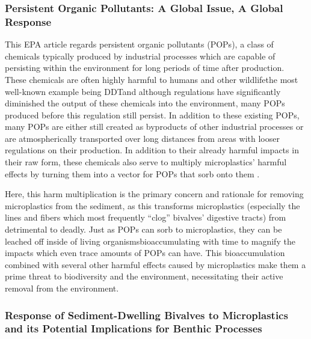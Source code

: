 \documentclass[fleqn,10pt]{SelfArx} %
\begin{document}
	
	\subsubsection*{Persistent Organic Pollutants: A Global Issue, A Global Response}
	This EPA article regards persistent organic pollutants (POPs), a class of chemicals typically produced by industrial processes which are capable of persisting within the environment for long periods of time after production. These chemicals are often highly harmful to humans and other wildlife\textemdash the most well-known example being DDT\textemdash and although regulations have significantly diminished the output of these chemicals into the environment, many POPs produced before this regulation still persist. In addition to these existing POPs, many POPs are either still created as byproducts of other industrial processes or are atmospherically transported over long distances from areas with looser regulations on their production. In addition to their already harmful impacts in their raw form, these chemicals also serve to multiply microplastics’ harmful effects by turning them into a vector for POPs that sorb onto them \cite{EPA}. 
	
	Here, this harm multiplication is the primary concern and rationale for removing microplastics from the sediment, as this transforms microplastics (especially the lines and fibers which most frequently “clog” bivalves’ digestive tracts) from detrimental to deadly. Just as POPs can sorb to microplastics, they can be leached off inside of living organisms\textemdash bioaccumulating with time to magnify the impacts which even trace amounts of POPs can have. This bioaccumulation combined with several other harmful effects caused by microplastics make them a prime threat to biodiversity and the environment, necessitating their active removal from the environment.
	
	\subsubsection*{Response of Sediment-Dwelling Bivalves to Microplastics and its Potential Implications for Benthic Processes}
	
\end{document}
